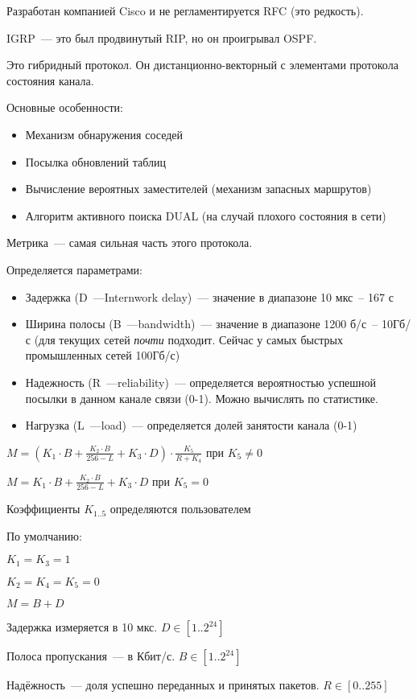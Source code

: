 Разработан компанией Cisco и не регламентируется RFC (это редкость).

IGRP~--- это был продвинутый RIP, но он проигрывал OSPF.

Это гибридный протокол. Он дистанционно-векторный с элементами протокола состояния канала.

Основные особенности:
\begin{itemize}
    \item Механизм обнаружения соседей
    \item Посылка обновлений таблиц
    \item Вычисление вероятных заместителей (механизм запасных маршрутов)
    \item Алгоритм активного поиска DUAL (на случай плохого состояния в сети)
\end{itemize}

Метрика~--- самая сильная часть этого протокола.

Определяется параметрами:
\begin{itemize}
    \item Задержка (D~---Internwork delay)~--- значение в диапазоне 10 мкс~-- 167 с
    \item Ширина полосы (B~---bandwidth)~--- значение в диапазоне 1200 б/с~-- 10Гб/с (для текущих сетей {\it почти} подходит. Сейчас у самых быстрых промышленных сетей 100Гб/с)
    \item Надежность (R~---reliability)~--- определяется вероятностью успешной посылки в данном канале связи (0-1). Можно вычислять по статистике.
    \item Нагрузка (L~---load)~--- определяется долей занятости канала (0-1)
\end{itemize}

$M=(K_1\cdot B + \frac{K_2\cdot B}{256-L} + K_3\cdot D)\cdot\frac{K_5}{R+K_4}$ при $K_5\neq 0$

$M=K_1\cdot B + \frac{K_2\cdot B}{256-L} + K_3\cdot D$ при $K_5= 0$

Коэффициенты $K_{1..5}$ определяются пользователем

По умолчанию:

$K_1=K_3=1$

$K_2=K_4=K_5=0$

$M=B+D$

Задержка измеряется в 10 мкс. $D\in[1..2^{24}]$

Полоса пропускания~--- в Кбит/с. $B\in[1..2^{24}]$

Надёжность~--- доля успешно переданных и принятых пакетов. $R\in[0..255]$

